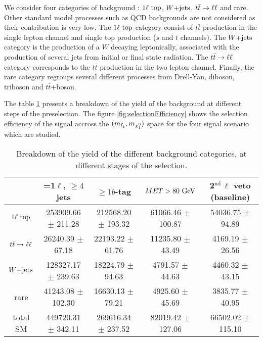         We consider four categories of background : $1\ell~\text{top}$, $\text{$W$+jets}$, $t\bar{t} \rightarrow \ell \ell$ and rare. Other standard
        model processes such as QCD backgrounds are not considered as their contribution is very low. The $1\ell~\text{top}$
        category consist of $t\bar{t}$ production in the single lepton channel and single top production ($s$ and $t$ channels).
        The $\text{$W$+jets}$ category is the production of a $W$ decaying leptonically, associated with the production of several
        jets from initial or final state radiation. The $t\bar{t} \rightarrow \ell \ell$ category corresponds to the $t\bar{t}$ production
        in the two lepton channel. Finally, the rare category regroups several different processes from Drell-Yan, diboson,
        triboson and $t\bar{t}$+boson.

        The table \ref{tab:cutflowPreselection} presents a breakdown of the yield of the background at different steps of the
        preselection. The figure \ref{fig:selectionEfficiency} shows the selection efficiency of the signal accross the $(m_{\tilde{t}_1},
        m_{\tilde{\chi}_1^0})$ space for the four signal scenario which are studied. 

        \begin{table}[h!]
            \hspace*{-0.7cm}
            \begin{tabular}{|c|cccc|}
                \hline
                & =1$\ell$, $\geq 4$ jets   & $\geq 1b$-tag             & $MET > 80 ~\text{GeV}$         &  2$^\text{nd}\, \ell$ veto (baseline) \\
                \hline
                $1\ell~\text{top}$ & 253909.66 $\pm$ 211.28    & 212568.20 $\pm$ 193.32    &  61066.46 $\pm$ 100.87  & 54036.75 $\pm$ 94.89     \\
                $t\bar{t} \rightarrow \ell \ell$  &  26240.39 $\pm$ 67.18     &  22193.22 $\pm$ 61.76     &  11235.80 $\pm$ 43.49   &  4169.19 $\pm$ 26.56     \\
                $\text{$W$+jets}$        & 128327.17 $\pm$ 239.63    &  18224.79 $\pm$ 94.63     &   4791.57 $\pm$ 44.63   &  4460.32 $\pm$ 43.15     \\
                rare            &  41243.08 $\pm$ 102.30    &  16630.13 $\pm$ 79.21     &   4925.60 $\pm$ 45.69   &  3835.77 $\pm$ 40.95     \\
                \hline
                total SM        & 449720.31 $\pm$ 342.11    & 269616.34 $\pm$ 237.52    &  82019.42 $\pm$ 127.06  & 66502.02 $\pm$ 115.10    \\
                \hline
            \end{tabular}
            \caption{Breakdown of the yield of the different background categories, at different stages of the selection.}
            \label{tab:cutflowPreselection}
        \end{table}

